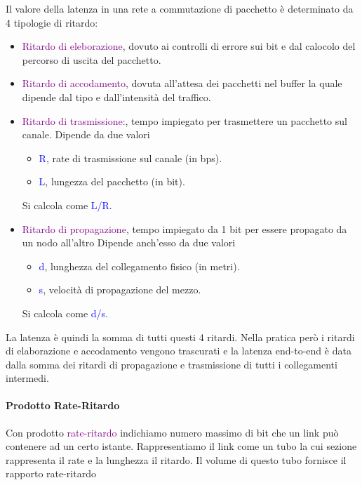     Il valore della latenza in una rete a commutazione di pacchetto è determinato da 4 tipologie di ritardo:
    \begin{itemize}
        \item \textcolor{purple}{Ritardo di eleborazione}, dovuto ai controlli di errore sui bit e dal calocolo del percorso di uscita del pacchetto.
        \item \textcolor{purple}{Ritardo di accodamento}, dovuta all'attesa dei pacchetti nel buffer la quale dipende dal tipo e dall'intensità del traffico.
        \item \textcolor{purple}{Ritardo di trasmissione:}, tempo impiegato per trasmettere un pacchetto sul canale. 
        \newline Dipende da due valori
        \begin{itemize}
            \item \textcolor{blue}{R}, rate di trasmissione sul canale (in bps).
            \item \textcolor{blue}{L}, lungezza del pacchetto (in bit).
        \end{itemize}
        Si calcola come \textcolor{blue}{L/R}.
        \item \textcolor{purple}{Ritardo di propagazione}, tempo impiegato da 1 bit per essere propagato da un nodo all’altro
        \newline Dipende anch'esso da due valori
        \begin{itemize}
            \item \textcolor{blue}{d}, lunghezza del collegamento fisico (in metri).
            \item \textcolor{blue}{s}, velocità di propagazione del mezzo.
        \end{itemize}
        Si calcola come \textcolor{blue}{d/s}.
    \end{itemize}
    
    La latenza è quindi la somma di tutti questi 4 ritardi. Nella pratica però i ritardi di elaborazione e accodamento vengono trascurati e la latenza end-to-end è data dalla somma dei ritardi di propagazione e trasmissione di tutti i collegamenti intermedi.

    \paragraph{Prodotto Rate-Ritardo} Con prodotto \textcolor{purple}{rate-ritardo} indichiamo numero massimo di bit che un link può contenere ad un certo istante. Rappresentiamo il link come un tubo la cui sezione rappresenta il rate e la lunghezza il ritardo. Il volume di questo tubo fornisce il rapporto rate-ritardo
    \newpage